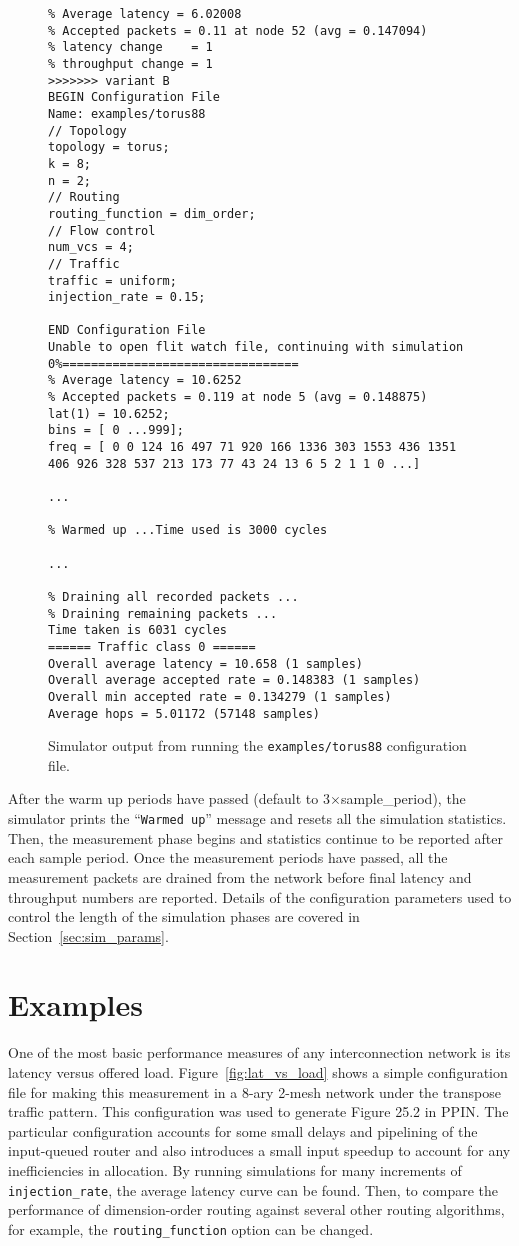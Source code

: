 \documentclass[11pt]{article}
\begin{document}
\begin{figure}
\begin{verbatim}
% Average latency = 6.02008
% Accepted packets = 0.11 at node 52 (avg = 0.147094)
% latency change    = 1
% throughput change = 1
>>>>>>> variant B
BEGIN Configuration File
Name: examples/torus88
// Topology
topology = torus;
k = 8;
n = 2;
// Routing
routing_function = dim_order;
// Flow control
num_vcs = 4;
// Traffic
traffic = uniform;
injection_rate = 0.15;

END Configuration File
Unable to open flit watch file, continuing with simulation
0%=================================
% Average latency = 10.6252
% Accepted packets = 0.119 at node 5 (avg = 0.148875)
lat(1) = 10.6252;
bins = [ 0 ...999];
freq = [ 0 0 124 16 497 71 920 166 1336 303 1553 436 1351 
406 926 328 537 213 173 77 43 24 13 6 5 2 1 1 0 ...]

...

% Warmed up ...Time used is 3000 cycles

...

% Draining all recorded packets ...
% Draining remaining packets ...
Time taken is 6031 cycles
====== Traffic class 0 ======
Overall average latency = 10.658 (1 samples)
Overall average accepted rate = 0.148383 (1 samples)
Overall min accepted rate = 0.134279 (1 samples)
Average hops = 5.01172 (57148 samples)
\end{verbatim}
\caption{Simulator output from running the \texttt{examples/torus88}
configuration file.}
\label{fig:sim_output}
\end{figure}

After the warm up periods have passed (default to 3$\times$sample\_period), the simulator prints the
``\texttt{Warmed up}'' message and resets all the simulation statistics.
Then, the measurement phase begins and statistics continue to be
reported after each sample period.  Once the measurement periods have
passed, all the measurement packets are drained from the network
before final latency and throughput numbers are reported.  Details of
the configuration parameters used to control the length of the
simulation phases are covered in Section~\ref{sec:sim_params}.

\section{Examples}
\label{sec:examples}

One of the most basic performance measures of any interconnection
network is its latency versus offered load.
Figure~\ref{fig:lat_vs_load} shows a simple configuration file for
making this measurement in a 8-ary 2-mesh network under the transpose
traffic pattern.  This configuration was used to generate Figure 25.2
in PPIN.  The particular configuration accounts for some small delays
and pipelining of the input-queued router and also introduces a small
input speedup to account for any inefficiencies in allocation.  By
running simulations for many increments of \texttt{injection\_rate},
the average latency curve can be found.  Then, to compare the
performance of dimension-order routing against several other routing
algorithms, for example, the \texttt{routing\_function} option can be
changed.
\end{document}
